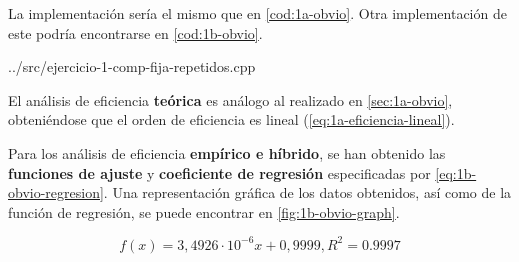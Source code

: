 La implementación sería el mismo que en \ref{cod:1a-obvio}. Otra implementación de este podría encontrarse en \ref{cod:1b-obvio}. 


{../src/ejercicio-1-comp-fija-repetidos.cpp} 


El análisis de eficiencia \textbf{teórica} es análogo al realizado en \ref{sec:1a-obvio}, obteniéndose 
que el orden de eficiencia es lineal (\ref{eq:1a-eficiencia-lineal}). 

Para los análisis de eficiencia \textbf{empírico e híbrido}, se han obtenido las \textbf{funciones de ajuste}
y \textbf{coeficiente de regresión} especificadas por \ref{eq:1b-obvio-regresion}. Una representación
gráfica de los datos obtenidos, así como de la función de regresión, se puede encontrar en \ref{fig:1b-obvio-graph}. 

\begin{equation}
    \boxed{f(x) = 3,4926 \cdot 10 ^{-6} x + 0,9999, R^2 = 0.9997}
    \label{eq:1b-obvio-regresion}
\end{equation}

